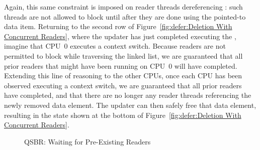 Again, this same constraint is imposed on reader threads dereferencing
: such threads are not allowed to block until after
they are done using the pointed-to data item.
Returning to the second row of
Figure~\ref{fig:defer:Deletion With Concurrent Readers},
where the updater has just completed executing the ,
imagine that CPU~0 executes a context switch.
Because readers are not permitted to block while traversing the linked
list, we are guaranteed that all prior readers that might have been running on
CPU~0 will have completed.
Extending this line of reasoning to the other CPUs, once each CPU has
been observed executing a context switch, we are guaranteed that all
prior readers have completed, and that there are no longer any reader
threads referencing the newly removed data element.
The updater can then safely free that data element, resulting in the
state shown at the bottom of
Figure~\ref{fig:defer:Deletion With Concurrent Readers}.

\begin{figure}[tb]
\centering
{}
\caption{QSBR: Waiting for Pre-Existing Readers}
\label{fig:defer:QSBR: Waiting for Pre-Existing Readers}
\end{figure}

